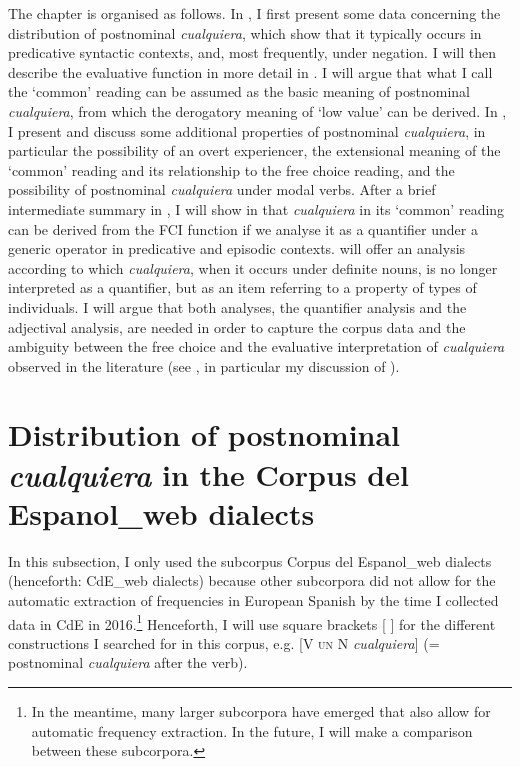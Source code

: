 The chapter is organised as follows. In , I first present some data concerning the distribution of postnominal \textit{cualquiera}, which show that it typically occurs in predicative syntactic contexts, and, most frequently, under negation. I will then describe the evaluative function in more detail in . I will argue that what I call the ‘common’ reading can be assumed as the basic meaning of postnominal \textit{cualquiera}, from which the derogatory meaning of ‘low value’ can be derived. In , I present and discuss some additional properties of postnominal \textit{cualquiera}, in particular the possibility of an overt experiencer, the extensional meaning of the ‘common’ reading and its relationship to the free choice reading, and the possibility of postnominal \textit{cualquiera} under modal verbs. After a brief intermediate summary in , I will show in  that \textit{cualquiera} in its ‘common’ reading can be derived from the FCI function if we analyse it as a quantifier under a generic operator in predicative and episodic contexts.  will offer an analysis according to which \textit{cualquiera}, when it occurs under definite nouns, is no longer interpreted as a quantifier, but as an item referring to a property of types of individuals. I will argue that both analyses, the quantifier analysis and the adjectival analysis, are needed in order to capture the corpus data and the ambiguity between the free choice and the evaluative interpretation of \textit{cualquiera} observed in the literature (see , in particular my discussion of \citealt{Alonso-OvalleMenéndez-Benito2011,am2018}).

\section[{Distribution} {in} {the} {Corpus} {del} {Espanol\_web} {dialects}]{{Distribution} {of} {postnominal} {\textit{cualquiera} }{in} {the} {Corpus} {del} {Espanol\_web} {dialects}} \label{sec:3.1}

In this subsection, I only used the subcorpus Corpus del Espanol\_web dialects (henceforth: CdE\_web dialects) because other subcorpora did not allow for the automatic extraction of frequencies in European Spanish by the time I collected data in CdE in 2016.\footnote{{In the meantime, many larger subcorpora have emerged that also allow for automatic frequency extraction. In the future, I will make a comparison between these subcorpora.}} Henceforth, I will use square brackets [ ] for the different constructions I searched for in this corpus, e.g. [V \textsc{un} N \textit{cualquiera}] (= postnominal \textit{cualquiera} after the verb).

